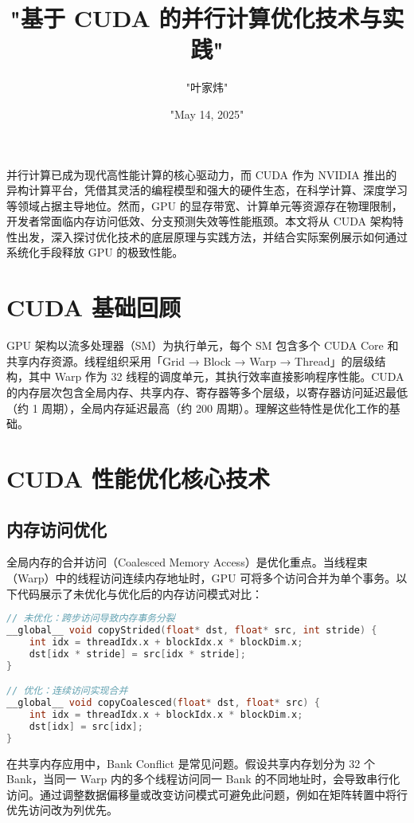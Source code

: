 \title{"基于 CUDA 的并行计算优化技术与实践"}
\author{"叶家炜"}
\date{"May 14, 2025"}
\maketitle
并行计算已成为现代高性能计算的核心驱动力，而 CUDA 作为 NVIDIA 推出的异构计算平台，凭借其灵活的编程模型和强大的硬件生态，在科学计算、深度学习等领域占据主导地位。然而，GPU 的显存带宽、计算单元等资源存在物理限制，开发者常面临内存访问低效、分支预测失效等性能瓶颈。本文将从 CUDA 架构特性出发，深入探讨优化技术的底层原理与实践方法，并结合实际案例展示如何通过系统化手段释放 GPU 的极致性能。\par
\chapter{CUDA 基础回顾}
GPU 架构以流多处理器（SM）为执行单元，每个 SM 包含多个 CUDA Core 和共享内存资源。线程组织采用「Grid → Block → Warp → Thread」的层级结构，其中 Warp 作为 32 线程的调度单元，其执行效率直接影响程序性能。CUDA 的内存层次包含全局内存、共享内存、寄存器等多个层级，以寄存器访问延迟最低（约 1 周期），全局内存延迟最高（约 200 周期）。理解这些特性是优化工作的基础。\par
\chapter{CUDA 性能优化核心技术}
\section{内存访问优化}
全局内存的合并访问（Coalesced Memory Access）是优化重点。当线程束（Warp）中的线程访问连续内存地址时，GPU 可将多个访问合并为单个事务。以下代码展示了未优化与优化后的内存访问模式对比：\par
\begin{lstlisting}[language=cpp]
// 未优化：跨步访问导致内存事务分裂
__global__ void copyStrided(float* dst, float* src, int stride) {
    int idx = threadIdx.x + blockIdx.x * blockDim.x;
    dst[idx * stride] = src[idx * stride];
}

// 优化：连续访问实现合并
__global__ void copyCoalesced(float* dst, float* src) {
    int idx = threadIdx.x + blockIdx.x * blockDim.x;
    dst[idx] = src[idx];
}
\end{lstlisting}
在共享内存应用中，Bank Conflict 是常见问题。假设共享内存划分为 32 个 Bank，当同一 Warp 内的多个线程访问同一 Bank 的不同地址时，会导致串行化访问。通过调整数据偏移量或改变访问模式可避免此问题，例如在矩阵转置中将行优先访问改为列优先。\par
